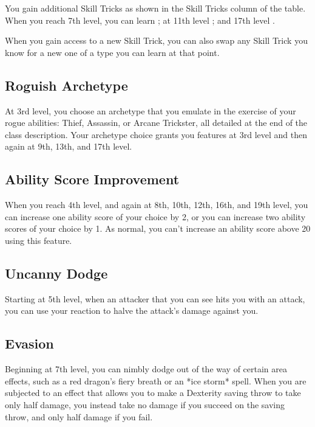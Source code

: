 You gain additional Skill Tricks as shown in the Skill Tricks column of the  table. When you reach 7th level, you can learn ; at 11th level ; and 17th level .

When you gain access to a new Skill Trick, you can also swap any Skill Trick you know for a new one of a type you can learn at that point.

\subsection{Roguish Archetype}

At 3rd level, you choose an archetype that you emulate in the exercise of your rogue abilities: Thief, Assassin, or Arcane Trickster, all detailed at the end of the class description. Your archetype choice grants you features at 3rd level and then again at 9th, 13th, and 17th level.

\subsection{Ability Score Improvement}

When you reach 4th level, and again at 8th, 10th, 12th, 16th, and 19th level, you can increase one ability score of your choice by 2, or you can increase two ability scores of your choice by 1. As normal, you can’t increase an ability score above 20 using this feature.

\subsection{Uncanny Dodge}

Starting at 5th level, when an attacker that you can see hits you with an attack, you can use your reaction to halve the attack’s damage against you.

\subsection{Evasion}

Beginning at 7th level, you can nimbly dodge out of the way of certain area effects, such as a red dragon’s fiery breath or an *ice storm* spell. When you are subjected to an effect that allows you to make a Dexterity saving throw to take only half damage, you instead take no damage if you succeed on the saving throw, and only half damage if you fail.

